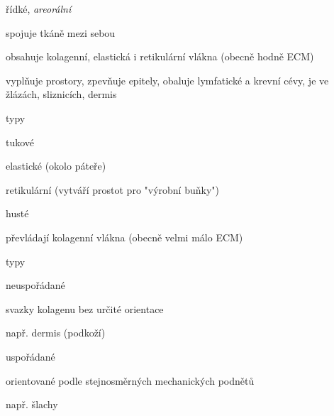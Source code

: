 \documentclass[DIV=8]{scrreprt}
\begin{document}
\begin{myItemize}[nosep]
    \item řídké, \emph{areorální}
\begin{myItemize}[nosep]
    \item spojuje tkáně mezi sebou
    \item obsahuje kolagenní, elastická i retikulární vlákna (obecně hodně ECM)
    \item vyplňuje prostory, zpevňuje epitely, obaluje lymfatické a krevní cévy, je ve žlázách, sliznicích, dermis
    \item typy
\begin{myItemize}[nosep]
    \item tukové
    \item elastické (okolo páteře)
    \item retikulární (vytváří prostot pro "výrobní buňky")
\end{myItemize}

\end{myItemize}

    \item husté
\begin{myItemize}[nosep]
    \item převládají kolagenní vlákna (obecně velmi málo ECM)
    \item typy
\begin{myItemize}[nosep]
    \item neuspořádané
\begin{myItemize}[nosep]
    \item svazky kolagenu bez určité orientace
    \item např. dermis (podkoží)
\end{myItemize}

    \item uspořádané
\begin{myItemize}[nosep]
    \item orientované podle stejnosměrných mechanických podnětů
    \item např. šlachy
\end{myItemize}

\end{myItemize}

\end{myItemize}

\end{myItemize}
\end{document}
